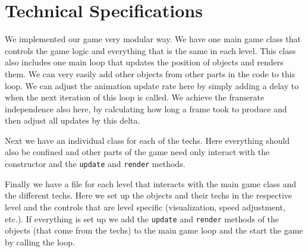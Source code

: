 \documentclass{article}
\begin{document}
\section{Technical Specifications}

We implemented our game very modular way. We have one main game class that controls the game logic 
and everything that is the same in each level. This class also includes one main loop that 
updates the position of objects and renders them. We can very easily add other objects from other parts in the 
code to this loop. We can adjust the animation update rate here 
by simply adding a delay to when the next iteration of this loop is called. 
We achieve the framerate independence also here, by calculating how long a frame took to produce 
and then adjust all updates by this delta. 

Next we have an individual class for each of the techs. Here everything should 
also be confined and other parts of the game need only interact with the constructor
and the \texttt{update} and \texttt{render} methods.

Finally we have a file for each level that interacts with the main game 
class and the different techs. Here we set up
the objects and their techs in the respective level and the controls that are level specific (visualization, speed adjustment, etc.).
If everything is set up we add the \texttt{update} and \texttt{render} methods of the objects (that come from the techs) 
to the main game loop and the start the game by calling the loop.
\end{document}
